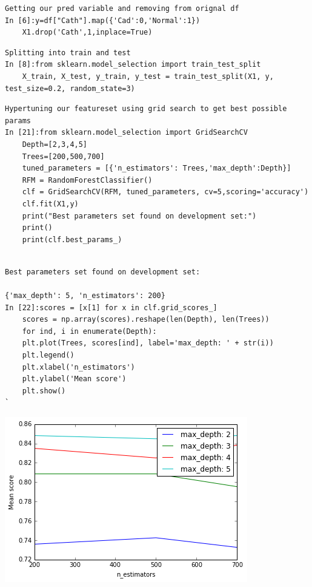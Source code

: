 \documentclass[sigconf]{acmart}
\begin{document}
\begin{lstlisting}
Getting our pred variable and removing from orignal df
In [6]:y=df["Cath"].map({'Cad':0,'Normal':1})
    X1.drop('Cath',1,inplace=True)
\end{lstlisting}
\begin{lstlisting}
Splitting into train and test
In [8]:from sklearn.model_selection import train_test_split
    X_train, X_test, y_train, y_test = train_test_split(X1, y, test_size=0.2, random_state=3)
\end{lstlisting}
\begin{lstlisting}
Hypertuning our featureset using grid search to get best possible params
In [21]:from sklearn.model_selection import GridSearchCV
    Depth=[2,3,4,5]
    Trees=[200,500,700]
    tuned_parameters = [{'n_estimators': Trees,'max_depth':Depth}]              
    RFM = RandomForestClassifier()
    clf = GridSearchCV(RFM, tuned_parameters, cv=5,scoring='accuracy')
    clf.fit(X1,y)
    print("Best parameters set found on development set:")
    print()
    print(clf.best_params_)
\end{lstlisting}
\begin{lstlisting}

Best parameters set found on development set:

{'max_depth': 5, 'n_estimators': 200}
In [22]:scores = [x[1] for x in clf.grid_scores_]
    scores = np.array(scores).reshape(len(Depth), len(Trees))
    for ind, i in enumerate(Depth):
    plt.plot(Trees, scores[ind], label='max_depth: ' + str(i))
    plt.legend()
    plt.xlabel('n_estimators')
    plt.ylabel('Mean score')
    plt.show()
`
\end{lstlisting}
\includegraphics[width=0.95\columnwidth]{images/output_15_1.png}
\end{document}
